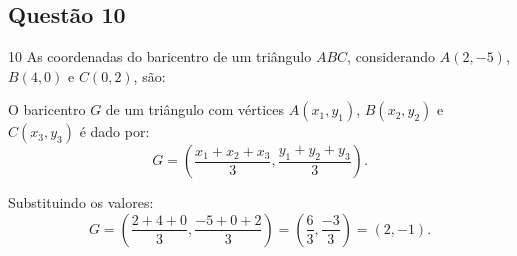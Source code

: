 \subsection*{Questão 10}

\begin{questionbox}{10}
  As coordenadas do baricentro de um triângulo $ABC$, considerando $A(2,-5)$, $B(4,0)$ e $C(0,2)$, são:
\end{questionbox}

\begin{solutionbox}
  O baricentro $G$ de um triângulo com vértices $A(x_1,y_1)$, $B(x_2,y_2)$ e $C(x_3,y_3)$ é dado por:
  \[
  G = \left( \frac{x_1 + x_2 + x_3}{3}, \frac{y_1 + y_2 + y_3}{3} \right).
  \]

  Substituindo os valores:
  \[
  G = \left( \frac{2 + 4 + 0}{3}, \frac{-5 + 0 + 2}{3} \right)
  = \left( \frac{6}{3}, \frac{-3}{3} \right)
  = (2, -1).
  \]
\end{solutionbox}